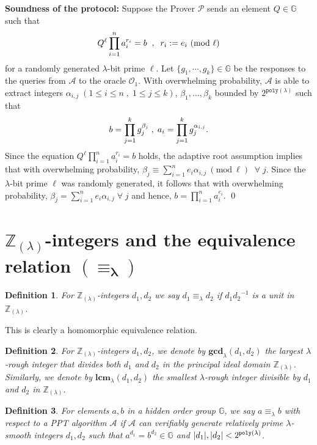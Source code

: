 \documentclass[11pt, lettersize, notitlepage, leqno, footskip=0.6cm]{article}
\newcommand{\bz}{\mathbb Z}
\newcommand{\pl}{\prod\limits}
\newcommand{\ttt}{\texttt}
\newcommand{\bG}{\mathbb{G}}
\newcommand{\LRA}{\Longleftrightarrow}
\newcommand{\eqlam}{\equiv_{\lam}}
\newcommand{\wti}{\widetilde}
\newcommand{\mc}{\mathcal}
\newcommand{\mb}{\mathbb}
\newcommand{\mbf}{\mathbf}
\newcommand{\al}{\alpha}
\newcommand{\be}{\beta}
\newcommand{\lam}{\lambda}
\newcommand{\lamb}{\lambda}
\newcommand{\bzlam}{\bz_{(\lam)}}
\newcommand{\mP}{\mc{P}}
\newcommand{\A}{\mc{A}}
\newcommand{\vs}{\vspace{-0.15cm}}
\newcommand{\noin}{\noindent}
\newcommand{\op}{overwhelming probability}
\newcommand{\Mod}[1]{\ (\mathrm{mod}\ #1)}
\newcommand{\LCM}{\mbf{lcm}}
\newcommand{\GCD}{\mbf{gcd}}
\newtheorem{Def}{Definition}[section]
\numberwithin{equation}{section}
\begin{document}
{{{\noin \textbf{Soundness of the protocol:} Suppose the Prover $\mP$ sends an element $Q\in\bG$ such that \vs $$Q^{\ell}\pl_{i=1}^n a_i^{r_i} = b\;\;,\;\;r_i:= e_i\Mod{\ell}\vs $$ for a randomly generated $\lam$-bit prime $\ell$. Let $\{g_1,\cdots,g_k\}\in \bG$ be the responses to the queries from $\A$ to the oracle $\mc{O}_1$. With \op, $\A$ is able to extract integers $\al_{i,j}\; (1\leq i \leq n\;,\;1\leq j \leq k)$, $\be_1,\dots, \be_k$ bounded by $2^{\ttt{poly}(\lam)}$ such that \vs $$b = \pl_{j=1}^k g_j^{\be_j}\;,\;a_i = \pl_{j=1}^k g_j^{\al_{i,j}}. \vspace{-0.25cm} $$ Since the equation $Q^{\ell}\prod_{i=1}^n a_i^{r_i} = b $ holds, the adaptive root assumption implies that with \op, $\be_j\equiv \sum_{i=1}^n e_i\al_{i, j}\Mod{\ell}\;\;\forall\; j.$ Since the $\lam$-bit prime $\ell$ was randomly generated, it follows that with \op, $ \be_j = \sum_{i=1}^n e_i\al_{i, j}\;\forall\; j$ and hence, $b = \prod_{i=1}^n a_i^{e_i}$. \qed

\section{\fontsize{11}{11}\selectfont $\bz_{(\lamb)}$-integers and the equivalence relation $\mathbf{(\equiv_{\lam})}$}


\begin{Def} For $\bzlam$-integers $d_1,d_2$ we say $d_1\eqlam d_2$ if ${d_1}{d_2}^{-1}$ is a unit in $\bzlam$.\end{Def}

\noin \hypertarget{shortcut}{This is clearly a homomorphic equivalence relation}.

\begin{Def} For $\bzlam$-integers $d_1,d_2$, we denote by $\GCD_{\lam}(d_1,d_2)$ the largest $\lam$-rough integer that divides both $d_1$ and $d_2$ in the principal ideal domain $\bzlam$. Similarly, we denote by $\LCM_{\lam}(d_1,d_2)$ the smallest $\lam$-rough integer divisible by $d_1$ and $d_2$ in $\bzlam$.\end{Def}


\begin{Def} For elements $a, b$ in a hidden order group $\mb{G}$, we say $ a \equiv_{\lam} b$ with respect to a PPT algorithm $\A$ if $\mc{A}$ can verifiably generate relatively prime $\lamb$-smooth integers $d_1, d_2$ such that $a^{d_1} = b^{d_2} \in \bG$ and $|d_1|,|d_2| < 2^{\tt{poly}(\lam)}$. \end{Def}

}}}
\end{document}

